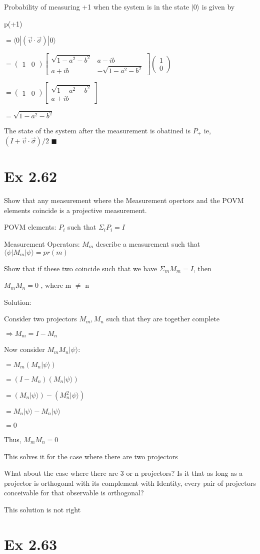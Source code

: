 \documentclass{article}
\newcommand{\0}{{$|0\rangle$}}
\newcommand{\1}{{$|1\rangle$}}
\newcommand{\2}{\frac{1}{\sqrt{2}}}
\newcommand{\psik}{|\psi\rangle}
\newcommand{\psib}{\langle\psi|}
\newcommand{\bpmx}{\begin{pmatrix}}
\newcommand{\epmx}{\end{pmatrix}}
\newcommand{\bbmx}{\begin{bmatrix}}
\newcommand{\ebmx}{\end{bmatrix}}
\begin{document}
Probability of measuring +1 when the system is in the state \0 is given by

p(+1) 

$ = \langle 0 | ( \vec{v} \cdot \vec{\sigma}) | 0 \rangle$

$ = \bpmx 1 & 0 \epmx \bbmx \sqrt{1 - a^2 -b^2} & a-ib\\ a+ib & -\sqrt{1 -a^2 -b^2}\ebmx \bpmx 1 \\ 0 \epmx$ 

$ = \bpmx 1 & 0 \epmx \bbmx \sqrt{1 - a^2 - b^2} \\ a+ib \ebmx $
    
$ = \sqrt{1 - a^2 -b^2}$

The state of the system after the measurement is obatined is $P_+$ ie, $(I + \vec{v} \cdot \vec{\sigma}) /2$
$\blacksquare$

\newpage
\section*{Ex 2.62}
Show that any measurement where the Measurement opertors and the POVM elements coincide is a projective measurement.

POVM elements: {$P_i$} such that $\Sigma_i P_i = I$

Measurement Operators: {$M_m$} describe a measurement such that $\psib M_m \psik = pr(m)$

Show that if these two coincide such that we have $\Sigma_m M_m = I$, then   

$M_mM_n = 0$ , where m $\neq$ n

Solution:

Consider two projectors $M_m, M_n$ such that they are together complete

$\Rightarrow M_m = I - M_n$

Now consider  $M_m M_n \psik$:

$ = M_m (M_n\psik)$

$= (I - M_n) (M_n \psik)$

$= (M_n \psik) - (M_n^2 \psik)$

$= M_n \psik - M_n \psik$

$= 0$

Thus, $M_m M_n = 0$

This solves it for the case where there are two projectors

What about the case where there are 3 or n projectors?
Is it that as long as a projector is orthogonal with its complement with Identity, every pair of projectors conceivable for that observable is orthogonal?

This solution is not right
\newpage
\section*{Ex 2.63}
\end{document}
